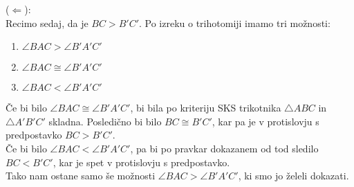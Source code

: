 \begin{dokaz}
\begin{enumerate}
            \end{enumerate}
            ($\Leftarrow$):
            \\ Recimo sedaj, da je $BC>B'C'$. Po izreku o trihotomiji imamo tri možnosti: \begin{enumerate}
                \item $\angle BAC > \angle B'A'C'$
                \item $\angle BAC \cong \angle B'A'C'$
                \item $\angle BAC < \angle B'A'C'$
            \end{enumerate}
            Če bi bilo $\angle BAC \cong \angle B'A'C'$, bi bila po kriteriju SKS trikotnika $\triangle ABC$ in $\triangle A'B'C'$ skladna. Posledično bi bilo $BC\cong B'C'$, kar pa je v protislovju s predpostavko $BC>B'C'$.
            \\ Če bi bilo $\angle BAC < \angle B'A'C'$, pa bi po pravkar dokazanem od tod sledilo $BC<B'C'$, kar je spet v protislovju s predpostavko.
            \\ Tako nam ostane samo še možnosti $\angle BAC > \angle B'A'C'$, ki smo jo želeli dokazati.
        \end{dokaz}

